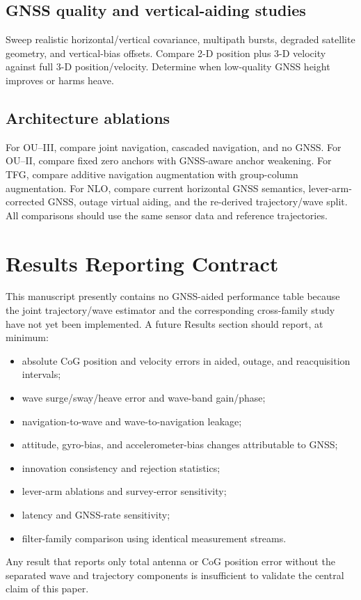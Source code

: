 \documentclass[conference]{IEEEtran}
\begin{document}
\subsection{GNSS quality and vertical-aiding studies}
Sweep realistic horizontal/vertical covariance, multipath bursts, degraded satellite
geometry, and vertical-bias offsets.  Compare 2-D position plus 3-D velocity against
full 3-D position/velocity.  Determine when low-quality GNSS height improves or harms
heave.

\subsection{Architecture ablations}
For OU--III, compare joint navigation, cascaded navigation, and no GNSS.  For OU--II,
compare fixed zero anchors with GNSS-aware anchor weakening.  For TFG, compare additive
navigation augmentation with group-column augmentation.  For NLO, compare current
horizontal GNSS semantics, lever-arm-corrected GNSS, outage virtual aiding, and the
re-derived trajectory/wave split.  All comparisons should use the same sensor data and
reference trajectories.

\section{Results Reporting Contract}
\label{sec:results}

This manuscript presently contains no GNSS-aided performance table because the joint
trajectory/wave estimator and the corresponding cross-family study have not yet been
implemented.  A future Results section should report, at minimum:
\begin{itemize}
  \item absolute CoG position and velocity errors in aided, outage, and reacquisition
  intervals;
  \item wave surge/sway/heave error and wave-band gain/phase;
  \item navigation-to-wave and wave-to-navigation leakage;
  \item attitude, gyro-bias, and accelerometer-bias changes attributable to GNSS;
  \item innovation consistency and rejection statistics;
  \item lever-arm ablations and survey-error sensitivity;
  \item latency and GNSS-rate sensitivity;
  \item filter-family comparison using identical measurement streams.
\end{itemize}
Any result that reports only total antenna or CoG position error without the separated
wave and trajectory components is insufficient to validate the central claim of this
paper.
\end{document}
